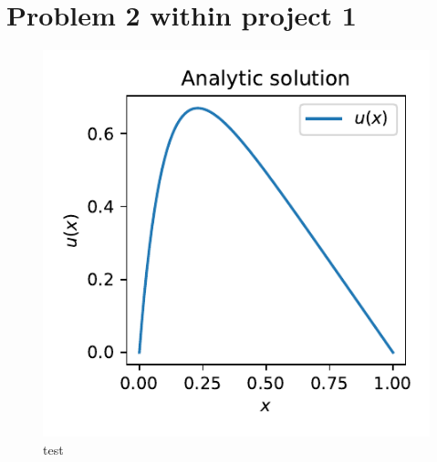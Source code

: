 \documentclass{article}
\begin{document}
\section{Problem 2 within project 1}


\begin{figure}
    \includegraphics{problem_2_fig.pdf}
    \caption{test}
\end{figure}
\end{document}
